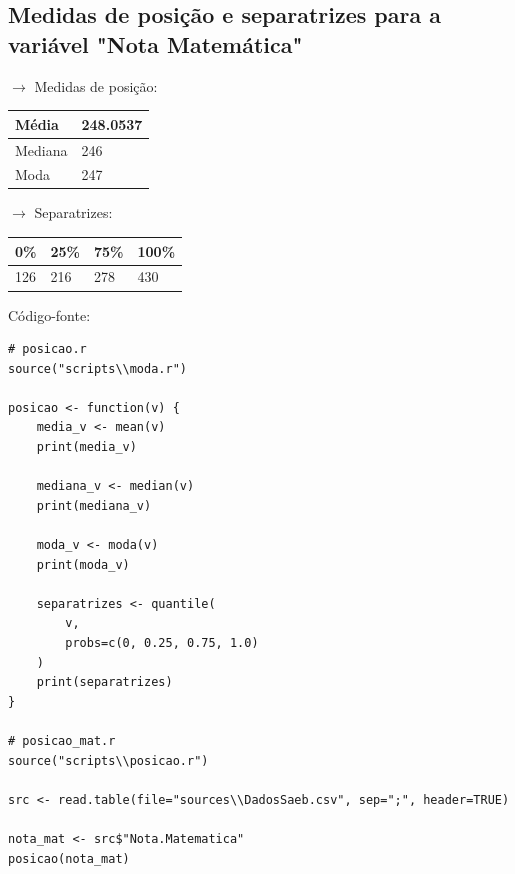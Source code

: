 \documentclass[17pt]{extarticle}
\begin{document}
\subsection{Medidas de posição e separatrizes para a variável "Nota Matemática"}
$\rightarrow$ Medidas de posição:
\begin{table}[H]
\begin{tabular}{|l|l|}
\hline
Média   & 248.0537 \\ \hline
Mediana & 246      \\ \hline
Moda    & 247      \\ \hline
\end{tabular}
\end{table}
\noindent
$\rightarrow$ Separatrizes:
\begin{table}[H]
\begin{tabular}{|l|l|l|l|}
\hline
0\% & 25\% & 75\% & 100\% \\ \hline
126 & 216  & 278  & 430   \\ \hline
\end{tabular}
\end{table}
\noindent
Código-fonte:
\begin{lstlisting}
# posicao.r
source("scripts\\moda.r")

posicao <- function(v) {
    media_v <- mean(v)
    print(media_v)

    mediana_v <- median(v)
    print(mediana_v)

    moda_v <- moda(v)
    print(moda_v)

    separatrizes <- quantile(
        v,
        probs=c(0, 0.25, 0.75, 1.0)
    )
    print(separatrizes)
}
    
# posicao_mat.r
source("scripts\\posicao.r")

src <- read.table(file="sources\\DadosSaeb.csv", sep=";", header=TRUE)

nota_mat <- src$"Nota.Matematica"
posicao(nota_mat)
\end{lstlisting}

\newpage
\end{document}
